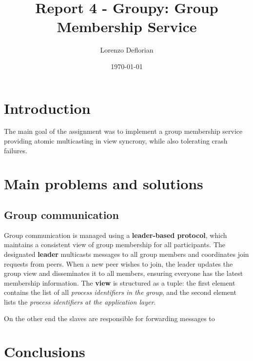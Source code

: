 \documentclass[a4paper, 11pt]{article}
\title{Report 4 - Groupy: Group Membership Service}
\author{Lorenzo Deflorian}
\date{\today{}}
\begin{document}
\maketitle

\section{Introduction}
The main goal of the assignment was to implement a group membership service providing atomic multicasting in view syncrony, while also tolerating crash failures.

\section{Main problems and solutions}
\subsection{Group communication}
Group communication is managed using a \textbf{leader-based protocol}, which maintains a consistent view of group membership for all participants. The designated \textbf{leader} multicasts messages to all group members and coordinates join requests from peers. When a new peer wishes to join, the leader updates the group view and disseminates it to all members, ensuring everyone has the latest membership information. The \textbf{view} is structured as a tuple: the first element contains the list of all \textit{process identifiers in the group}, and the second element lists the \textit{process identifiers at the application layer}.

On the other end the slaves are responsible for forwarding messages to 



\section{Conclusions}
\end{document}
